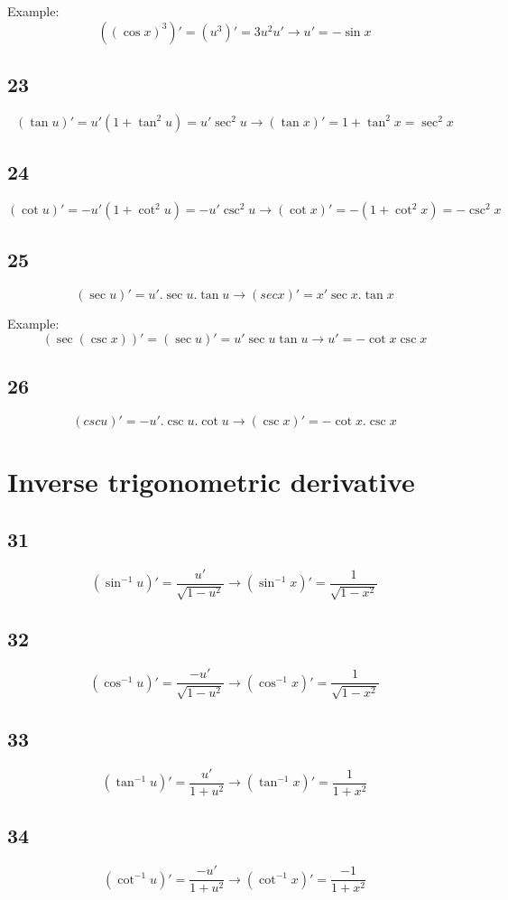 Example:
\[ ((\cos x)^3)' = (u^3)' = 3u^2u' \to u' = -\sin x \]

\subsection{23}
\[ (\tan u)' = u'(1+\tan^2u) = u'\sec^2u \to (\tan x)' = 1+\tan^2 x = \sec^2 x \]

\subsection{24}
\[ (\cot u)' = -u'(1+\cot^2u) = -u'\csc^2u \to (\cot x)' = -(1+\cot^2x) = -\csc^2x \]

\subsection{25}
\[ (\sec u)' = u'.\sec u.\tan u \to (sec x)' = x'\sec x.\tan x \]

Example:
\[ (\sec(\csc x))' = (\sec u)' = u'\sec u\tan u \to u' = -\cot x \csc x \]


\subsection{26}
\[ (csc u)' = -u'.\csc u.\cot u \to (\csc x)' = -\cot x.\csc x \]


\section{Inverse trigonometric derivative}
\subsection{31}
\[ (\sin^{-1} u)' = \frac{u'}{\sqrt{1-u^2}} \to (\sin^{-1}x)' = \frac{1}{\sqrt{1-x^2}} \]

\subsection{32}
\[ (\cos^{-1} u)' = \frac{-u'}{\sqrt{1-u^2}} \to (\cos^{-1}x)' = \frac{1}{\sqrt{1-x^2}} \]

\subsection{33}
\[ (\tan^{-1} u)' = \frac{u'}{1+u^2} \to (\tan^{-1}x)' = \frac{1}{1+x^2} \]

\subsection{34}
\[ (\cot^{-1} u)' = \frac{-u'}{1+u^2} \to (\cot^{-1}x)' = \frac{-1}{1+x^2} \]

